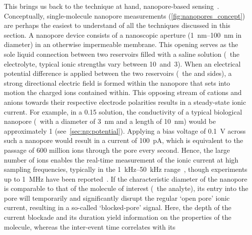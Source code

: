 This brings us back to the technique at hand, nanopore-based sensing~\cite{Howorka-2009,Wang-2018}.
Conceptually, single-molecule nanopore measurements (\cref{fig:nanopores_concept}) are perhaps the easiest to
understand of all the techniques discussed in this section. A nanopore device consists of a nanoscopic
aperture (\SIrange{1}{100}{\nm} in diameter) in an otherwise impermeable membrane. This opening serves as the
sole liquid connection between two reservoirs filled with a saline solution (\ie~the electrolyte, typical
ionic strengths vary between \SI{10}{\mM}~and~\SI{3}{\Molar}). When an electrical potential difference is
applied between the two reservoirs (\ie~the \cisi{} and \transi{} sides), a strong directional electric field
is formed within the nanopore that sets into motion the charged ions contained within. This opposing stream of
cations and anions towards their respective electrode polarities results in a steady-state ionic current. For
example, in a \SI{0.15}{\Molar}  solution, the conductivity of a typical biological nanopore (\eg~with
a diameter of \SI{3}{\nm} and a length of \SI{10}{\nm}) would be approximately \SI{1}{\nS}
(see~\cref{sec:np:potential}). Applying a bias voltage of \SI{0.1}{\volt} across such a nanopore would result
in a current of \SI{100}{\pA}, which is equivalent to the passage of \num{600} million ions through the pore
every second. Hence, the large number of ions enables the real-time measurement of the ionic current at high
sampling frequencies, typically in the \SIrange{1}{50}{\kHz} range~\cite{Maglia-2010}, though experiments up
to \SI{1}{\mega\hertz} have been reported~\cite{Rosenstein-2012}.\footnotemark%
%
%
If the characteristic diameter of the nanopore is comparable to that of the molecule of interest (\ie~the
analyte), its entry into the pore will temporarily and significantly disrupt the regular `open pore' ionic
current, resulting in a so-called `blocked-pore' signal. Here, the depth of the current blockade and its
duration yield information on the properties of the molecule, whereas the inter-event time correlates with its
